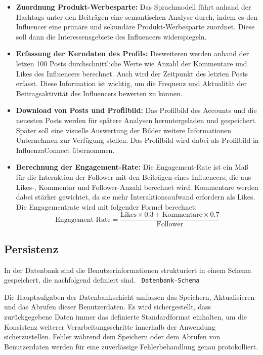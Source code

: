 \documentclass[conference,a4paper,flushend]{cs-techrep}
\begin{document}
\begin{itemize}

\item{\textbf{Zuordnung Produkt-Werbesparte:} Das Sprachmodell führt anhand der Hashtags unter den Beiträgen eine semantischen Analyse durch, indem es den Influencer eine primäre und sekundäre Produkt-Werbesparte zuordnet. Diese soll dann die Interessensgebiete des Influencers widerspiegeln.}

\item{\textbf{Erfassung der Kerndaten des Profils:} Desweiteren werden anhand der letzen 100 Posts durchschnittliche Werte wie Anzahl der Kommentare und Likes des Influencers berechnet. Auch wird der Zeitpunkt des letzten Posts erfasst. Diese Information ist wichtig, um die Frequenz und Aktualität der Beitragsaktivität des Influencers bewerten zu können.}

\item{\textbf{Download von Posts und Profilbild:} Das Profilbild des Accounts und die neuesten Posts werden für spätere Analysen heruntergeladen und gespeichert. Später soll eine visuelle Auswertung der Bilder weitere Informationen Unternehmen zur Verfügung stellen. Das Profilbild wird dabei als Profilbild in InfluenzaConnect übernommen. }

\item{\textbf{Berechnung der Engagement-Rate:} Die Engagement-Rate ist ein Maß für die Interaktion der Follower mit den Beiträgen eines Influencers, die aus Likes-, Kommentar und Follower-Anzahl berechnet wird. Kommentare werden dabei stärker gewichtet, da sie mehr Interaktionsaufwand erfordern als Likes. Die Engagementrate wird mit folgender Formel berechnet: \[
\text{Engagement-Rate} = \frac{\text{Likes} \times 0.3 + \text{Kommentare} \times 0.7}{\text{Follower}} \] }
\end{itemize}



\subsection{Persistenz}

In der Datenbank sind die Benutzerinformationen strukturiert in einem Schema gespeichert, die nachfolgend definiert sind. 
\texttt{
Datenbank-Schema
}

Die Hauptaufgaben der Datenbankschicht umfassen das Speichern, Aktualisieren und das Abrufen dieser Benutzerdaten. Es wird sichergestellt, dass zurückgegebene Daten immer das definierte Standardformat einhalten, um die Konsistenz weiterer Verarbeitungsschritte innerhalb der Anwendung sicherzustellen. Fehler während dem Speichern oder dem Abrufen von Benutzerdaten werden für eine zuverlässige Fehlerbehandlung genau protokolliert.
\end{document}
